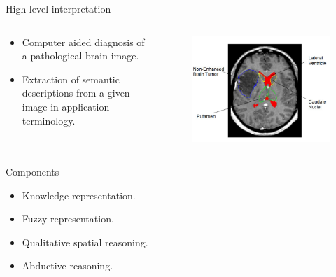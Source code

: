 \documentclass{beamer}
\begin{document}
\begin{frame}{High level interpretation}
\begin{columns}
\begin{column}{0.6\textwidth}
 \begin{itemize}
  \item Computer aided diagnosis of a pathological brain image.
  \item Extraction of semantic descriptions from a given image in application terminology.
 \end{itemize}
\end{column}

\begin{column}{0.4\textwidth}
	\begin{figure}
	\includegraphics[width=\textwidth]{images/cerebrale.png}
	\end{figure}\vspace{-0.5cm}
	\end{column}
\end{columns}

\begin{block}{Components}
\centering
 \begin{itemize}
  \item Knowledge representation.
  \item Fuzzy representation.
  \item Qualitative spatial reasoning.
  \item Abductive reasoning.
 \end{itemize}
\end{block}

\end{frame}
\end{document}
